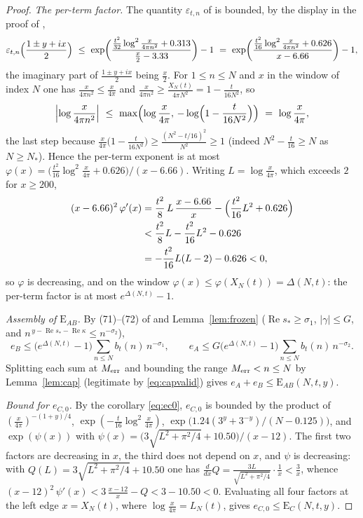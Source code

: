 \documentclass[11pt]{article}
\theoremstyle{definition}
\newcommand{\eps}{\varepsilon}
\DeclareMathOperator{\Rea}{Re}
\begin{document}
\begin{proof}
\emph{The per-term factor.} The quantity $\eps_{t,n}$ of
\cite[(44)]{Polymath} is bounded, by the display in the proof of
\cite[Proposition~6.6(iv),(v)]{Polymath},
\[
\eps_{t,n}\Bigl(\frac{1\pm y+ix}2\Bigr)
\ \le\
\exp\biggl(
\frac{\frac{t^2}{32}\log^2\frac{x}{4\pi n^2}+0.313}
{\frac x2-3.33}
\biggr)-1
\ =\
\exp\biggl(
\frac{\frac{t^2}{16}\log^2\frac{x}{4\pi n^2}+0.626}{x-6.66}
\biggr)-1 ,
\]
the imaginary part of $\frac{1\pm y+ix}2$ being $\frac x2$. For
$1\le n\le N$ and $x$ in the window of index $N$ one has
$\frac{x}{4\pi n^2}\le\frac{x}{4\pi}$ and
$\frac{x}{4\pi n^2}\ge\frac{X_N(t)}{4\pi N^2}
=1-\frac t{16N^2}$, so
\[
\Bigl|\log\frac{x}{4\pi n^2}\Bigr|
\ \le\ \max\Bigl(\log\frac x{4\pi},
\,-\log\Bigl(1-\frac t{16N^2}\Bigr)\Bigr)
\ =\ \log\frac x{4\pi},
\]
the last step because
$\frac x{4\pi}\bigl(1-\frac t{16N^2}\bigr)
\ge\frac{(N^2-t/16)^2}{N^2}\ge1$ (indeed
$N^2-\frac t{16}\ge N$ as $N\ge N_*$). Hence the per-term
exponent is at most
$\varphi(x)
=\bigl(\frac{t^2}{16}\log^2\frac x{4\pi}+0.626\bigr)/(x-6.66)$.
Writing $L=\log\frac x{4\pi}$, which exceeds $2$ for $x\ge200$,
\[
\begin{aligned}
(x-6.66)^2\,\varphi'(x)
&=\frac{t^2}{8}\,L\,\frac{x-6.66}{x}
-\Bigl(\frac{t^2}{16}L^2+0.626\Bigr)\\
&<\frac{t^2}{8}L-\frac{t^2}{16}L^2-0.626\\
&=-\frac{t^2}{16}L(L-2)-0.626<0,
\end{aligned}
\]
so $\varphi$ is decreasing, and on the window
$\varphi(x)\le\varphi(X_N(t))=\Delta(N,t)$: the per-term factor
is at most $e^{\Delta(N,t)}-1$.

\emph{Assembly of $\mathrm{E}_{AB}$.} By (71)--(72) of
\cite{Polymath} and Lemma~\ref{lem:frozen}
($\Rea s_*\ge\sigma_1$, $|\gamma|\le G$, and
$n^{\,y-\Rea s_*-\Rea\kappa}\le n^{-\sigma_2}$),
\[
e_B\le\bigl(e^{\Delta(N,t)}-1\bigr)
\sum_{n\le N}b_t(n)\,n^{-\sigma_1},
\qquad
e_A\le G\bigl(e^{\Delta(N,t)}-1\bigr)
\sum_{n\le N}b_t(n)\,n^{-\sigma_2}.
\]
Splitting each sum at $M_{\rm err}$ and bounding the range
$M_{\rm err}<n\le N$ by Lemma~\ref{lem:cap} (legitimate by
\eqref{eq:capvalid}) gives
$e_A+e_B\le\mathrm{E}_{AB}(N,t,y)$.

\emph{Bound for $e_{C,0}$.} By the corollary \eqref{eq:ec0},
$e_{C,0}$ is bounded by the product of
$(\frac x{4\pi})^{-(1+y)/4}$,
$\exp(-\frac t{16}\log^2\frac x{4\pi})$,
$\exp\bigl(1.24(3^y+3^{-y})/(N-0.125)\bigr)$, and
$\exp(\psi(x))$ with
$\psi(x)=\bigl(3\sqrt{L^2+\pi^2/4}+10.50\bigr)/(x-12)$. The
first two factors are decreasing in $x$, the third does not depend
on $x$, and $\psi$ is decreasing: with
$Q(L)=3\sqrt{L^2+\pi^2/4}+10.50$ one has
$\frac{d}{dx}Q=\frac{3L}{\sqrt{L^2+\pi^2/4}}\cdot\frac1x
<\frac3x$, whence
$(x-12)^2\,\psi'(x)<3\,\frac{x-12}x-Q<3-10.50<0$. Evaluating
all four factors at the left edge $x=X_N(t)$, where
$\log\frac x{4\pi}=L_N(t)$, gives
$e_{C,0}\le\mathrm{E}_{C}(N,t,y)$.


\end{proof}
\end{document}
